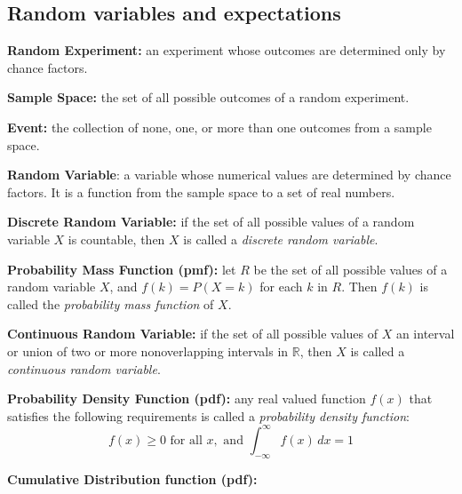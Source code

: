 \subsection{Random variables and expectations}
\begin{definition}
	\textbf{Random Experiment:} an experiment whose outcomes are determined only by chance factors.
\end{definition}
\begin{definition}
	\textbf{Sample Space:} the set of all possible outcomes of a random experiment.
\end{definition}
\begin{definition}
	\textbf{Event:} the collection of none, one, or more than one outcomes from a sample space.
\end{definition}
\begin{definition}
	\textbf{Random Variable}: a variable whose numerical values are determined by chance factors. It is a function from the sample space to a set of real numbers.
\end{definition}
\begin{definition}
	\textbf{Discrete Random Variable:} if the set of all possible values of a random variable $X$ is countable, then $X$ is called a \textit{discrete random variable}.
\end{definition}
\begin{definition}
	\textbf{Probability Mass Function (pmf):} let $R$ be the set of all possible values of a random variable $X$, and $f(k) = P(X = k)$ for each $k$ in $R$. Then $f(k)$ is called the \textit{probability mass function} of $X$.
\end{definition}
\begin{definition}
	\textbf{Continuous Random Variable:} if the set of all possible values of $X$ an interval or union of two or more nonoverlapping intervals in $\mathbb{R}$, then $X$ is called a \textit{continuous random variable}.
\end{definition}
\begin{definition}
	\textbf{Probability Density Function (pdf):} any real valued function $f(x)$ that satisfies the following requirements is called a \textit{probability density function}:
	\[
		f(x) \geq 0 \text{ for all } x, \text{ and } \int_{-\infty}^{\infty}f(x)\,dx = 1
	\]
\end{definition}
\begin{definition}
	\textbf{Cumulative Distribution function (pdf):}
\end{definition}
\begin{definition}
	\textbf{}
\end{definition}
\begin{definition}
	\textbf{}
\end{definition}
\begin{definition}
	\textbf{}
\end{definition}
\begin{definition}
	\textbf{}
\end{definition}
